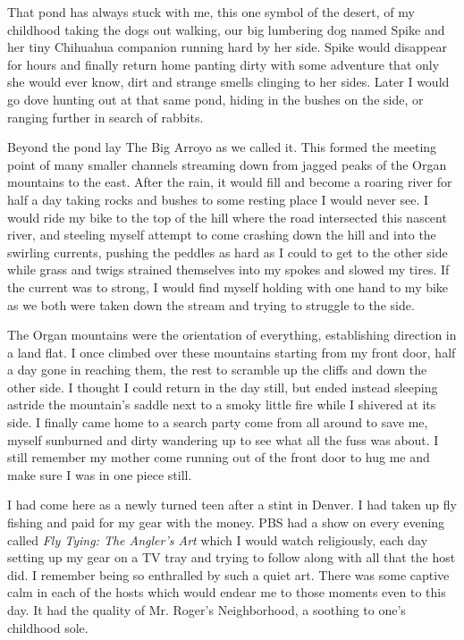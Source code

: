 \documentclass[ebook, 10pt, openright, onecolumn]{memoir}
\newcommand*\td[1]{
  \todo[inline]{
     #1 
  }
}
\newcommand*\finish{\td{ ----- Finish this section -----}}
\begin{document}
That pond has always stuck with me, this one symbol of the desert, of my
childhood taking the dogs out walking, our big lumbering dog named Spike and her
tiny Chihuahua companion running hard by her side.  Spike would disappear for
hours and finally return home panting dirty with some adventure that only she
would ever know, dirt and strange smells clinging to her sides.  Later I would
go dove hunting out at that same pond, hiding in the bushes on the side, or
ranging further in search of rabbits.

Beyond the pond lay The Big Arroyo as we called it.  This formed the meeting
point of many smaller channels streaming down from jagged peaks of the Organ
mountains to the east.  After the rain, it would fill and become a roaring river
for half a day taking rocks and bushes to some resting place I would never see.
I would ride my bike to the top of the hill where the road intersected this
nascent river, and steeling myself attempt to come crashing down the hill and
into the swirling currents, pushing the peddles as hard as I could to get to the
other side while grass and twigs strained themselves into my spokes and slowed
my tires.  If the current was to strong, I would find myself holding with one
hand to my bike as we both were taken down the stream and trying to struggle to
the side.

The Organ mountains were the orientation of everything, establishing direction
in a land flat.  I once climbed over these mountains starting from my front
door, half a day gone in reaching them, the rest to scramble up the cliffs and
down the other side.  I thought I could return in the day still, but ended
instead sleeping astride the mountain's saddle next to a smoky little fire while
I shivered at its side.  I finally came home to a search party come from all
around to save me, myself sunburned and dirty wandering up to see what all the
fuss was about.  I still remember my mother come running out of the front door
to hug me and make sure I was in one piece still.

\finish

I had come here as a newly turned teen after a stint in Denver.  I had taken up
fly fishing and paid for my gear with the money.  PBS had a show on every
evening called \textit{Fly Tying: The Angler's Art} which I would watch
religiously, each day setting up my gear on a TV tray and trying to follow along
with all that the host did.  I remember being so enthralled by such a quiet
art.  There was some captive calm in each of the hosts which would endear me to
those moments even to this day.  It had the quality of Mr. Roger's Neighborhood,
a soothing to one's childhood sole.
\end{document}
